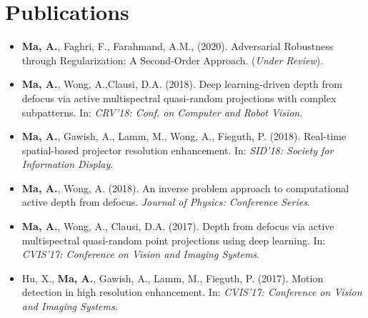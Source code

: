 \section*{Publications}
    \vspace{\postsubhead}
    \begin{adjustwidth}{\indentleft}{\indentright}
        \begin{itemize}
        
            \item \textbf{Ma, A.}, Faghri, F., Farahmand, A.M., (2020). Adversarial Robustness through Regularization: A Second-Order Approach. (\textit{Under Review}).
            
            \item \textbf{Ma, A.}, Wong, A.,Clausi, D.A. (2018). Deep learning-driven depth from defocus via active multispectral quasi-random projections with complex subpatterns. In: \emph{CRV'18: Conf. on Computer and Robot Vision}.
            
            \item \textbf{Ma, A.}, Gawish, A., Lamm, M., Wong, A., Fieguth, P. (2018). Real-time spatial-based projector resolution enhancement. In: \emph{SID'18: Society for Information Display}.
            
            \item \textbf{Ma, A.}, Wong, A. (2018). An inverse problem approach to computational active depth from defocus. \emph{Journal of Physics: Conference Series}.
            
            \item \textbf{Ma, A.}, Wong, A., Clausi, D.A. (2017). Depth from defocus via active multispectral quasi-random point projections using deep learning. In: \emph{CVIS'17: Conference on Vision and Imaging Systems}.
           
            \item Hu, X., \textbf{Ma, A.}, Gawish, A., Lamm, M., Fieguth, P. (2017). Motion detection in high resolution enhancement. In: \emph{CVIS'17: Conference on Vision and Imaging Systems}.
            

\end{itemize}
\end{adjustwidth}
